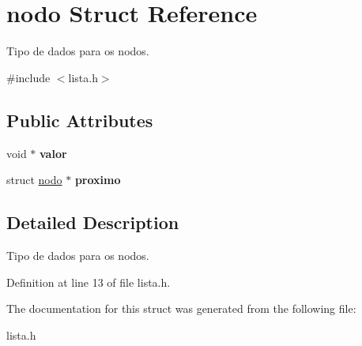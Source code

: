 \hypertarget{structnodo}{}\section{nodo Struct Reference}
\label{structnodo}


Tipo de dados para os nodos.  




{\ttfamily \#include $<$lista.\+h$>$}

\subsection*{Public Attributes}
\begin{DoxyCompactItemize}
\item 
\mbox{\label{structnodo_ab63adcdb83ea1fdcf4fa10f3cafc4a6a}} 
void $\ast$ {\bfseries valor}
\item 
\mbox{\label{structnodo_aaaabdcb6641ddcdac8990402242b154a}} 
struct \hyperlink{structnodo}{nodo} $\ast$ {\bfseries proximo}
\end{DoxyCompactItemize}


\subsection{Detailed Description}
Tipo de dados para os nodos. 

Definition at line 13 of file lista.\+h.



The documentation for this struct was generated from the following file\+:\begin{DoxyCompactItemize}
\item 
lista.\+h\end{DoxyCompactItemize}
